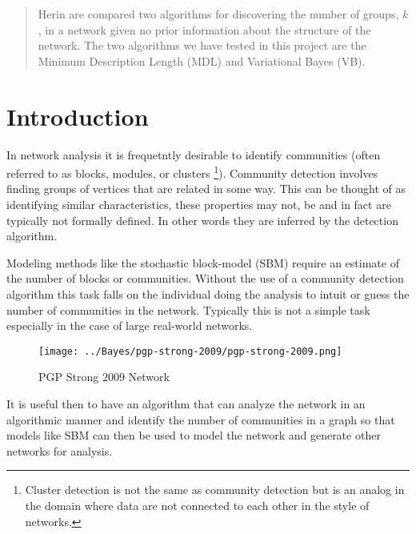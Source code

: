 \documentclass[twocolumn,twoside]{IEEEtran}
\author{Brett Israelsen \& Joshua Rahm}
\begin{document}
\maketitle

\begin{abstract}
Herin are compared two algorithms for discovering
the number of groups, $k$, in a network given no prior information about the
structure of the network. The two algorithms we have tested in this project are
the Minimum Description Length (MDL)\cite{Peixoto2013} and Variational Bayes (VB)\cite{Hofman2008}.
\end{abstract}

\section*{Introduction}\label{sec:Intro} In network analysis it is frequetntly
desirable to identify communities (often referred to as blocks, modules, or
clusters \footnote{Cluster detection is not the same as community detection but
is an analog in the domain where data are not connected to each other in the style
of networks.}). Community detection involves finding groups of vertices that
are related in some way. This can be thought of as identifying similar characteristics,
these properties may not, be and in fact are typically not formally defined. In
other words they are inferred by the detection algorithm.

Modeling methods like the stochastic block-model (SBM) require an estimate of 
the number of blocks or communities. Without the use of a community detection
algorithm this task falls on the individual doing the analysis to intuit or
guess the number of communities in the network. Typically this is not a simple
task especially in the case of large real-world networks.

\begin{figure}
\texttt{[image: ../Bayes/pgp-strong-2009/pgp-strong-2009.png]}
\caption{PGP Strong 2009 Network}
\end{figure}

It is useful then to have an algorithm that can analyze the network in an
algorithmic manner and identify the number of communities in a graph so that
models like SBM can then be used to model the network and generate other
networks for analysis.

% 
% 
% 
\end{document}
